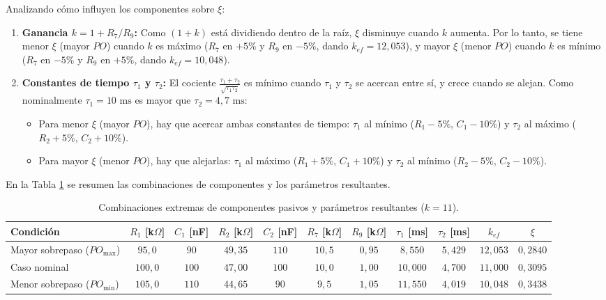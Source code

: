 \documentclass[11pt,a4paper]{article}
\begin{document}
Analizando cómo influyen los componentes sobre $\xi$:
\begin{enumerate}
    \item \textbf{Ganancia $k = 1 + R_7/R_9$:} Como $(1+k)$ está dividiendo dentro de la raíz, $\xi$ disminuye cuando $k$ aumenta. Por lo tanto, se tiene menor $\xi$ (mayor $PO$) cuando $k$ es máximo ($R_7$ en $+5\%$ y $R_9$ en $-5\%$, dando $k_{ef} = 12,053$), y mayor $\xi$ (menor $PO$) cuando $k$ es mínimo ($R_7$ en $-5\%$ y $R_9$ en $+5\%$, dando $k_{ef} = 10,048$).
    \item \textbf{Constantes de tiempo $\tau_1$ y $\tau_2$:} El cociente $\frac{\tau_1 + \tau_2}{\sqrt{\tau_1 \tau_2}}$ es mínimo cuando $\tau_1$ y $\tau_2$ se acercan entre sí, y crece cuando se alejan. Como nominalmente $\tau_1 = 10\text{ ms}$ es mayor que $\tau_2 = 4,7\text{ ms}$:
    \begin{itemize}
        \item Para menor $\xi$ (mayor $PO$), hay que acercar ambas constantes de tiempo: $\tau_1$ al mínimo ($R_1 -5\%$, $C_1 -10\%$) y $\tau_2$ al máximo ($R_2 +5\%$, $C_2 +10\%$).
        \item Para mayor $\xi$ (menor $PO$), hay que alejarlas: $\tau_1$ al máximo ($R_1 +5\%$, $C_1 +10\%$) y $\tau_2$ al mínimo ($R_2 -5\%$, $C_2 -10\%$).
    \end{itemize}
\end{enumerate}

En la Tabla \ref{tab:punto7a} se resumen las combinaciones de componentes y los parámetros resultantes.

\begin{table}[H]
    \centering
    \footnotesize
    \setlength{\tabcolsep}{2.8pt}
    \begin{tabular}{l c c c c c c c c c c}
        \toprule
        \textbf{Condición} & \textbf{$R_1$ [k$\Omega$]} & \textbf{$C_1$ [nF]} & \textbf{$R_2$ [k$\Omega$]} & \textbf{$C_2$ [nF]} & \textbf{$R_7$ [k$\Omega$]} & \textbf{$R_9$ [k$\Omega$]} & \textbf{$\tau_1$ [ms]} & \textbf{$\tau_2$ [ms]} & \textbf{$k_{ef}$} & \textbf{$\xi$} \\
        \midrule
        Mayor sobrepaso ($PO_{\max}$) & $95,0$ & $90$ & $49,35$ & $110$ & $10,5$ & $0,95$ & $8,550$ & $5,429$ & $12,053$ & $0,2840$ \\
        Caso nominal & $100,0$ & $100$ & $47,00$ & $100$ & $10,0$ & $1,00$ & $10,000$ & $4,700$ & $11,000$ & $0,3095$ \\
        Menor sobrepaso ($PO_{\min}$) & $105,0$ & $110$ & $44,65$ & $90$ & $9,5$ & $1,05$ & $11,550$ & $4,019$ & $10,048$ & $0,3438$ \\
        \bottomrule
    \end{tabular}
    \caption{Combinaciones extremas de componentes pasivos y parámetros resultantes ($k = 11$).}
    \label{tab:punto7a}
\end{table}
\end{document}
